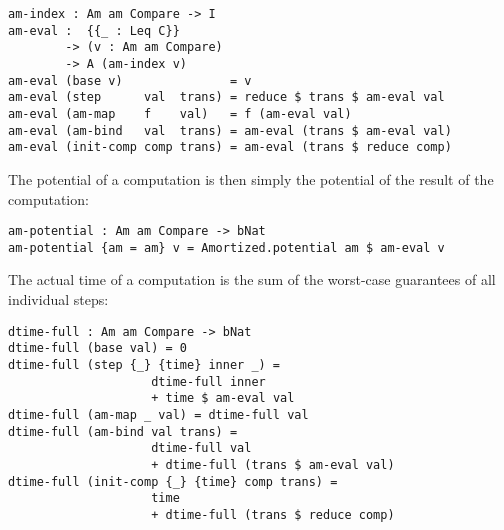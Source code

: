 \begin{lstlisting}[caption={Evaluating amortized computations},label={lst:amortized:framework:eval},emph={am,index,eval}]
am-index : Am am Compare -> I
am-eval :  {{_ : Leq C}}
        -> (v : Am am Compare)
        -> A (am-index v)
am-eval (base v)               = v
am-eval (step      val  trans) = reduce $ trans $ am-eval val
am-eval (am-map    f    val)   = f (am-eval val)
am-eval (am-bind   val  trans) = am-eval (trans $ am-eval val)
am-eval (init-comp comp trans) = am-eval (trans $ reduce comp)
\end{lstlisting}

The potential of a computation is then simply the potential of the result of the computation:

\begin{lstlisting}[caption={Potential of a computation},label={lst:amortized:framework:pot},emph={am,potential}]
am-potential : Am am Compare -> bNat
am-potential {am = am} v = Amortized.potential am $ am-eval v
\end{lstlisting}

The actual time of a computation is the sum of the worst-case guarantees of all individual steps:

\begin{lstlisting}[caption={Actual time},label={lst:amortized:framework:actualtime},emph={dtime,full}]
dtime-full : Am am Compare -> bNat
dtime-full (base val) = 0
dtime-full (step {_} {time} inner _) =
                    dtime-full inner
                    + time $ am-eval val
dtime-full (am-map _ val) = dtime-full val
dtime-full (am-bind val trans) =
                    dtime-full val
                    + dtime-full (trans $ am-eval val)
dtime-full (init-comp {_} {time} comp trans) =
                    time
                    + dtime-full (trans $ reduce comp)
\end{lstlisting}

